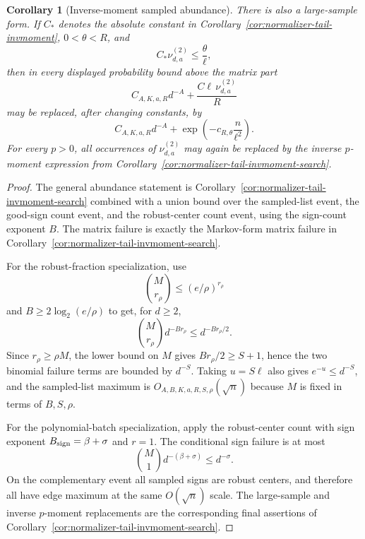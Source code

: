 \documentclass[11pt]{amsart}
\numberwithin{equation}{section}
\newtheorem{corollary}[theorem]{Corollary}
\theoremstyle{definition}
\theoremstyle{remark}
\begin{document}
\begin{corollary}[Inverse-moment sampled abundance]
There is also a large-sample form.  If \(C_*\) denotes the absolute constant in
Corollary~\ref{cor:normalizer-tail-invmoment}, \(0<\theta<R\), and
\[
  C_*\nu_{d,a}^{(2)}\le\frac{\theta}{\ell},
\]
then in every displayed probability bound above the matrix part
\[
  C_{A,K,a,R}d^{-A}+\frac{C\ell\,\nu_{d,a}^{(2)}}{R}
\]
may be replaced, after changing constants, by
\[
  C_{A,K,a,R}d^{-A}
  +\exp\left(-c_{R,\theta}\frac n{\ell^2}\right).
\]
For every \(p>0\), all occurrences of \(\nu_{d,a}^{(2)}\) may again be replaced
by the inverse \(p\)-moment expression from
Corollary~\ref{cor:normalizer-tail-invmoment-search}.
\end{corollary}

\begin{proof}
The general abundance statement is
Corollary~\ref{cor:normalizer-tail-invmoment-search} combined with a union
bound over the sampled-list event, the good-sign count event, and the
robust-center count event, using the sign-count exponent \(B\).  The matrix
failure is exactly the Markov-form matrix failure in
Corollary~\ref{cor:normalizer-tail-invmoment-search}.

For the robust-fraction specialization, use
\[
  \binom{M}{r_\rho}\le (e/\rho)^{r_\rho}
\]
and \(B\ge2\log_2(e/\rho)\) to get, for \(d\ge2\),
\[
  \binom{M}{r_\rho}d^{-B r_\rho}
  \le d^{-B r_\rho/2}.
\]
Since \(r_\rho\ge\rho M\), the lower bound on \(M\) gives
\(B r_\rho/2\ge S+1\), hence the two binomial failure terms are bounded by
\(d^{-S}\).  Taking \(u=S\ell\) also gives \(e^{-u}\le d^{-S}\), and the
sampled-list maximum is \(O_{A,B,K,a,R,S,\rho}(\sqrt n)\) because \(M\) is
fixed in terms of \(B,S,\rho\).

For the polynomial-batch specialization, apply the robust-center count with
sign exponent \(B_{\rm sign}=\beta+\sigma\) and \(r=1\).  The conditional sign
failure is at most
\[
  \binom M1 d^{-(\beta+\sigma)}\le d^{-\sigma}.
\]
On the complementary event all sampled signs are robust centers, and therefore
all have edge maximum at the same \(O(\sqrt n)\) scale.  The large-sample and
inverse \(p\)-moment replacements are the corresponding final assertions of
Corollary~\ref{cor:normalizer-tail-invmoment-search}.
\end{proof}
\end{document}

